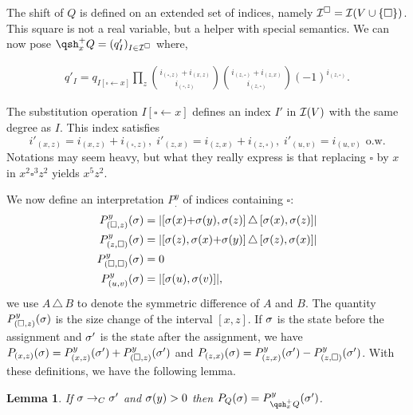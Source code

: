 \documentclass[nocopyrightspace,preprint]{sigplanconf-pldi15}
\newtheorem{lemma}{Lemma}
\begin{document}
The shift of $Q$ is defined on an extended set of indices, namely
$\mathcal{I}^\square = \mathcal{I}(V \cup \{\square\})$.  This square is not a real
variable, but a helper with special semantics.
We can now pose $\qsh_x^+ Q = (q'_I)_{I\in\ind^\square}$ where,

\begin{align*}
q'_I =
q_{I[\square \gets x]}
\prod_z
   \binom{i_{(\square,z)} {+} i_{(x,z)}}{i_{(\square,z)}}
   \binom{i_{(z,\square)} {+} i_{(z,x)}}{i_{(z,\square)}}
   (-1)^{i_{(z,\square)}}
   .
\end{align*}

The substitution operation $I[\square \gets x]$ defines an index $I'$
in $\mathcal{I}(V)$ with the same degree as $I$.  This index satisfies
$$
i'_{(x,z)} {=} i_{(x,z)} {+} i_{(\square,z)}, \;
i'_{(z,x)} {=} i_{(z,x)} {+} i_{(z,\square)}, \;
i'_{(u,v)} {=} i_{(u,v)} \mbox{ o.w.}
$$
Notations may seem heavy, but what they really express is that
replacing $\square$ by $x$ in $x^2\square^3z^2$ yields $x^5z^2$.

We now define an interpretation $P_.^y$ of indices containing
$\square$:
\begin{align*}
P^y_{(\square,z)}(\sigma) &=
  \left| [\sigma(x){+}\sigma(y), \sigma(z)] \,\triangle\,
         [\sigma(x), \sigma(z)] \right| \\
P^y_{(z,\square)}(\sigma) &=
  \left| [\sigma(z), \sigma(x){+}\sigma(y)] \,\triangle\,
         [\sigma(z), \sigma(x)] \right| \\
P^y_{(\square, \square)}(\sigma) &= 0 \\
P^y_{(u,v)}(\sigma) &= |[\sigma(u), \sigma(v)]|,
\end{align*}
we use $A \,\triangle\, B$ to denote the symmetric difference
of $A$ and $B$.
The quantity $P^y_{(\square,z)}(\sigma)$ is the size change of
the interval $[x, z]$.  If $\sigma$ is the state before the
assignment and $\sigma'$ is the state after the assignment, we
have
$P_{(x,z)}(\sigma) = P^y_{(x,z)}(\sigma') + P^y_{(\square,z)}(\sigma')$
and
$P_{(z,x)}(\sigma) = P^y_{(z,x)}(\sigma') - P^y_{(z,\square)}(\sigma')$.
With these definitions, we have the following lemma.
\begin{lemma}
If $\sigma \rightarrow_C \sigma'$ and $\sigma(y)>0$ then
$P_Q(\state) = P^y_{\qsh^+_x Q}(\state')$.
\end{lemma}
\end{document}
